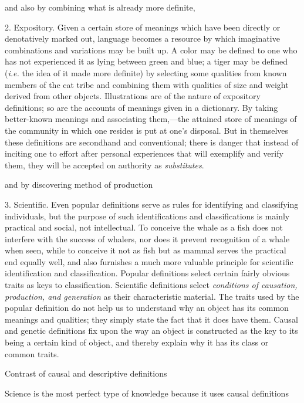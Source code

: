 \documentclass[letterpaper]{book}
\begin{document}
and also by combining what is already more definite,

2. Expository. Given a certain store of meanings which have been
directly or denotatively marked out, language becomes a resource by
which imaginative combinations and variations may be built up. A color
may be defined to one who has not experienced it as lying between green
and blue; a tiger may be defined (\emph{i.e.} the idea of it made more
definite) by selecting some qualities from known members of the cat
tribe and combining them with qualities of size and weight derived from
other objects. Illustrations are of the nature of expository
definitions; so are the accounts of meanings given in a dictionary. By
taking better-known meanings and associating them,---the attained store
of meanings of the community in which one resides is put at one's
disposal. But in themselves these definitions are secondhand and
conventional; there is danger that instead of inciting one to effort
after personal experiences
that
will exemplify and verify them, they will be accepted on authority as
\emph{substitutes}.

and by discovering method of production

3. Scientific. Even popular definitions serve as rules for identifying
and classifying individuals, but the purpose of such identifications and
classifications is mainly practical and social, not intellectual. To
conceive the whale as a fish does not interfere with the success of
whalers, nor does it prevent recognition of a whale when seen, while to
conceive it not as fish but as mammal serves the practical end equally
well, and also furnishes a much more valuable principle for scientific
identification and classification. Popular definitions select certain
fairly obvious traits as keys to classification. Scientific definitions
select \emph{conditions of causation, production, and generation} as
their characteristic material. The traits used by the popular definition
do not help us to understand why an object has its common meanings and
qualities; they simply state the fact that it does have them. Causal and
genetic definitions fix upon the way an object is constructed as the key
to its being a certain kind of object, and thereby explain why it has
its class or common traits.

Contrast of causal and descriptive definitions

Science is the most perfect type of knowledge because it uses causal
definitions
\end{document}
